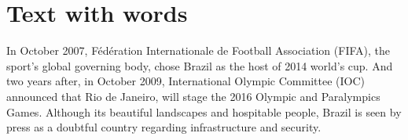 \documentclass[a4paper,12pt]{article}
\begin{document}
\titleTMB 
\newpage
{} %

\section{Text with words}


In October 2007, Fédération Internationale de Football Association (FIFA), the
sport's global governing body, chose Brazil as the host of 2014 world's cup.
And two years after, in October 2009, International Olympic Committee (IOC)
announced  that Rio de Janeiro,  will stage  the 2016  Olympic  and Paralympics
Games.  
Although its beautiful landscapes and hospitable people,
Brazil is seen by press as a doubtful country  regarding infrastructure and security.
\end{document}
